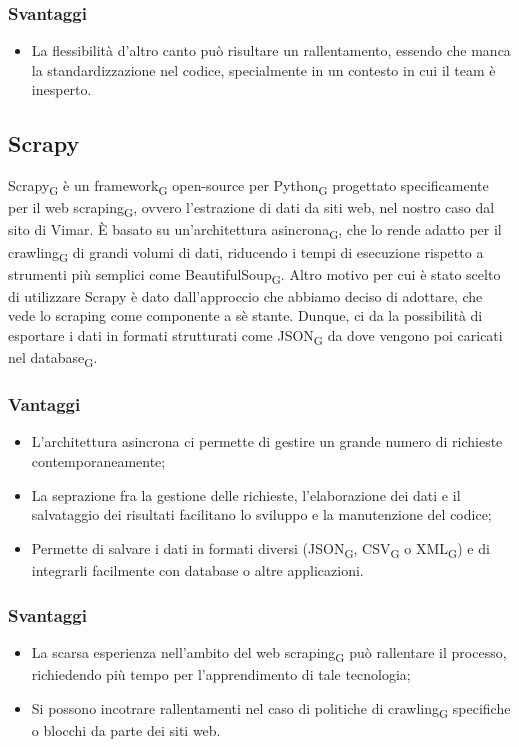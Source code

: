 \subsubsection{Svantaggi}
\begin{itemize}
    \item La flessibilità d'altro canto può risultare un rallentamento, essendo che manca la standardizzazione nel codice, specialmente in un contesto in cui il team è inesperto.
\end{itemize}

\subsection{Scrapy}
Scrapy\textsubscript{G} è un framework\textsubscript{G} open-source per Python\textsubscript{G} progettato specificamente per il web scraping\textsubscript{G}, ovvero l'estrazione di dati da siti web, nel nostro caso dal sito di Vimar. È basato su un'architettura asincrona\textsubscript{G}, che lo rende adatto per il crawling\textsubscript{G} di grandi volumi di dati, riducendo i tempi di esecuzione rispetto a strumenti più semplici come BeautifulSoup\textsubscript{G}. Altro motivo per cui è stato scelto di utilizzare Scrapy è dato dall'approccio che abbiamo deciso di adottare, che vede lo scraping come componente a sè stante. Dunque, ci da la possibilità di esportare i dati in formati strutturati come JSON\textsubscript{G} da dove vengono poi caricati nel database\textsubscript{G}.
\subsubsection{Vantaggi}
\begin{itemize}
    \item L'architettura asincrona ci permette di gestire un grande numero di richieste contemporaneamente;
    \item La seprazione fra la gestione delle richieste, l'elaborazione dei dati e il salvataggio dei risultati facilitano lo sviluppo e la manutenzione del codice;
    \item Permette di salvare i dati in formati diversi (JSON\textsubscript{G}, CSV\textsubscript{G} o XML\textsubscript{G}) e di integrarli facilmente con database o altre applicazioni.
\end{itemize}
\subsubsection{Svantaggi}
\begin{itemize}
    \item La scarsa esperienza nell'ambito del web scraping\textsubscript{G} può rallentare il processo, richiedendo più tempo per l'apprendimento di tale tecnologia;
    \item Si possono incotrare rallentamenti nel caso di politiche di crawling\textsubscript{G} specifiche o blocchi da parte dei siti web.
\end{itemize}

